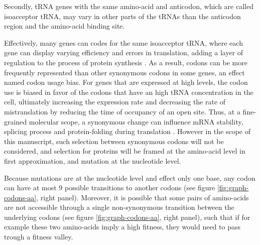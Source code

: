 Secondly, tRNA genes with the same amino-acid and anticodon, which are called isoacceptor tRNA, may vary in other parts of the tRNAs than the anticodon region and the amino-acid binding site.

Effectively, many genes can codes for the same isoacceptor tRNA, where each gene can display varying efficiency and errors in translation, adding a layer of regulation to the process of protein synthesis \citep{Lowe1997,Chan2008,Juhling2008,Lin2019}.
As a result, codons can be more frequently represented than other synonymous codons in some genes, an effect named codon usage bias.
For genes that are expressed at high levels, the codon use is biased in favor of the codons that have an high tRNA concentration in the cell, ultimately increasing the expression rate and decreasing the rate of mistranslation by reducing the time of occupancy of an open site.
Thus, at a fine-grained molecular scope, a synonymous change can influence mRNA stability, splicing process and protein-folding during translation \citep{Plotkin2011, Rak2018}.
However in the scope of this manuscript, such selection between synonymous codons will not be considered, and selection for proteins will be framed at the amino-acid level in first approximation, and mutation at the nucleotide level.

Because mutations are at the nucleotide level and effect only one base, any codon can have at most $9$ possible transitions to another codons (see figure \ref{fig:graph-codons-aa}, right panel).
Moreover, it is possible that some pairs of amino-acids are not accessible through a single non-synonymous transition between the underlying codons (see figure \ref{fig:graph-codons-aa}, right panel), such that if for example these two amino-acids imply a high fitness, they would need to pass trough a fitness valley.


